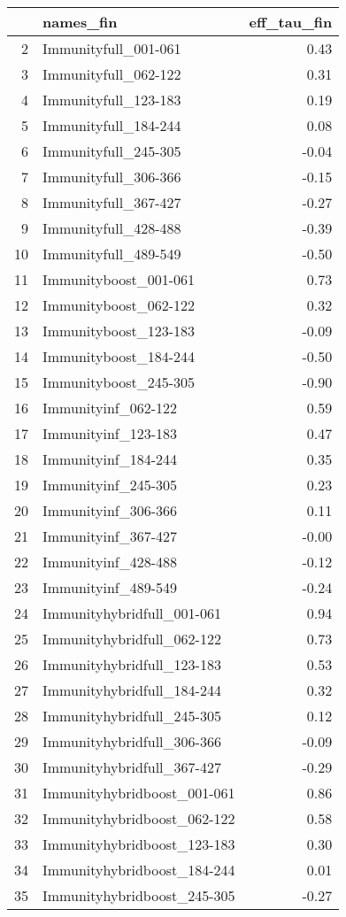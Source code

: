 \begin{table}[ht]
\centering
\begin{tabular}{rlr}
  \hline
 & names\_fin & eff\_tau\_fin \\ 
  \hline
2 & Immunityfull\_001-061 & 0.43 \\ 
  3 & Immunityfull\_062-122 & 0.31 \\ 
  4 & Immunityfull\_123-183 & 0.19 \\ 
  5 & Immunityfull\_184-244 & 0.08 \\ 
  6 & Immunityfull\_245-305 & -0.04 \\ 
  7 & Immunityfull\_306-366 & -0.15 \\ 
  8 & Immunityfull\_367-427 & -0.27 \\ 
  9 & Immunityfull\_428-488 & -0.39 \\ 
  10 & Immunityfull\_489-549 & -0.50 \\ 
  11 & Immunityboost\_001-061 & 0.73 \\ 
  12 & Immunityboost\_062-122 & 0.32 \\ 
  13 & Immunityboost\_123-183 & -0.09 \\ 
  14 & Immunityboost\_184-244 & -0.50 \\ 
  15 & Immunityboost\_245-305 & -0.90 \\ 
  16 & Immunityinf\_062-122 & 0.59 \\ 
  17 & Immunityinf\_123-183 & 0.47 \\ 
  18 & Immunityinf\_184-244 & 0.35 \\ 
  19 & Immunityinf\_245-305 & 0.23 \\ 
  20 & Immunityinf\_306-366 & 0.11 \\ 
  21 & Immunityinf\_367-427 & -0.00 \\ 
  22 & Immunityinf\_428-488 & -0.12 \\ 
  23 & Immunityinf\_489-549 & -0.24 \\ 
  24 & Immunityhybridfull\_001-061 & 0.94 \\ 
  25 & Immunityhybridfull\_062-122 & 0.73 \\ 
  26 & Immunityhybridfull\_123-183 & 0.53 \\ 
  27 & Immunityhybridfull\_184-244 & 0.32 \\ 
  28 & Immunityhybridfull\_245-305 & 0.12 \\ 
  29 & Immunityhybridfull\_306-366 & -0.09 \\ 
  30 & Immunityhybridfull\_367-427 & -0.29 \\ 
  31 & Immunityhybridboost\_001-061 & 0.86 \\ 
  32 & Immunityhybridboost\_062-122 & 0.58 \\ 
  33 & Immunityhybridboost\_123-183 & 0.30 \\ 
  34 & Immunityhybridboost\_184-244 & 0.01 \\ 
  35 & Immunityhybridboost\_245-305 & -0.27 \\ 
   \hline
\end{tabular}
\end{table}
